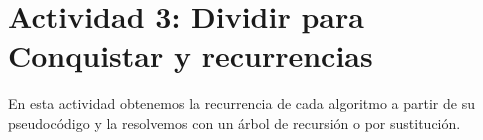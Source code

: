 \section{Actividad 3: Dividir para Conquistar y recurrencias}
\label{sec:act3}

En esta actividad obtenemos la recurrencia de cada algoritmo a partir de su pseudocódigo y
la resolvemos con un árbol de recursión o por sustitución.



